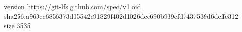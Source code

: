 version https://git-lfs.github.com/spec/v1
oid sha256:a969cc6856373d05542c91829f402d1026dcc690b939cfd7437539d6dcffe312
size 3535
